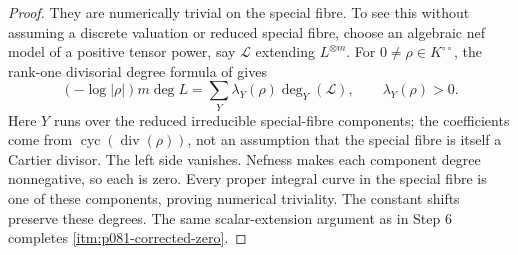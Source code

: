 \begin{proof}
They are numerically trivial on the special fibre.  To see this without
assuming a discrete valuation or reduced special fibre, choose an
algebraic nef model of a positive tensor power, say $\mathcal L$
extending $L^{\otimes m}$.  For $0\ne\rho\in K^{\circ\circ}$, the
rank-one divisorial degree formula of \cite[\S4.8]{GM19} gives
\[
 (-\log|\rho|)m\deg L
      =\sum_Y\lambda_Y(\rho)\deg_Y(\mathcal L),\qquad
                            \lambda_Y(\rho)>0.
\]
Here $Y$ runs over the reduced irreducible special-fibre components;
the coefficients come from
$\operatorname{cyc}(\operatorname{div}(\rho))$, not an assumption
that the special fibre is itself a Cartier divisor.  The left side
vanishes.  Nefness makes each component degree nonnegative, so each is
zero.  Every proper integral curve in the special fibre is one of
these components, proving numerical triviality.  The constant shifts
preserve these degrees.  The same scalar-extension argument as in
Step 6 completes \cref{itm:p081-corrected-zero}.
\end{proof}

